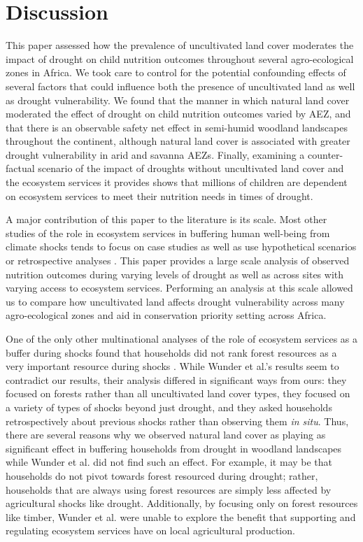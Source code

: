 \documentclass{article}
\begin{document}
\section{Discussion}

This paper assessed how the prevalence of uncultivated land cover moderates the impact of drought on child nutrition outcomes throughout several agro-ecological zones in Africa.  We took care to control for the potential confounding effects of several factors that could influence both the presence of uncultivated land as well as drought vulnerability.  We found that the manner in which natural land cover moderated the effect of drought on child nutrition outcomes varied by AEZ, and that there is an observable safety net effect in semi-humid woodland landscapes throughout the continent, although natural land cover is associated with greater drought vulnerability in arid and savanna AEZs.  Finally, examining a counter-factual scenario of the impact of droughts without uncultivated land cover and the ecosystem services it provides shows that millions of children are dependent on ecosystem services to meet their nutrition needs in times of drought.

A major contribution of this paper to the literature is its scale.  Most other studies of the role in ecosystem services in buffering human well-being from climate shocks tends to focus on case studies \cite{Debela2012} as well as use hypothetical scenarios \cite{Robledo2012} or retrospective analyses \cite{Muller2008}.  This paper provides a large scale analysis of observed nutrition outcomes during varying levels of drought as well as across sites with varying access to ecosystem services.  Performing an analysis at this scale allowed us to compare how uncultivated land affects drought vulnerability across many agro-ecological zones and aid in conservation priority setting across Africa.

One of the only other multinational analyses of the role of ecosystem services as a buffer during shocks found that households did not rank forest resources as a very important resource during shocks \cite{Wunder2014}.  While Wunder et al.'s results seem to contradict our results, their analysis differed in significant ways from ours: they focused on forests rather than all uncultivated land cover types, they focused on a variety of types of shocks beyond just drought, and they asked households retrospectively about previous shocks rather than observing them \textit{in situ}.  Thus, there are several reasons why we observed natural land cover as playing as significant effect in buffering households from drought in woodland landscapes while Wunder et al. did not find such an effect.  For example, it may be that households do not pivot towards forest resourced during drought; rather, households that are always using forest resources are simply less affected by agricultural shocks like drought. Additionally, by focusing only on forest resources like timber, Wunder et al. were unable to explore the benefit that supporting and regulating ecosystem services have on local agricultural production.  
\end{document}
